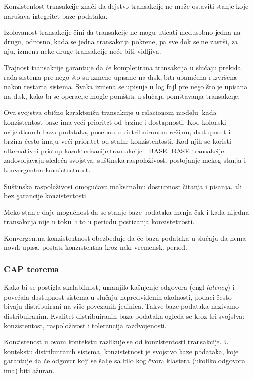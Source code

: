 \documentclass[12pt,oneside]{memoir}
\begin{document}
Konzistentost transakcije znači da dejstvo transakcije ne može ostaviti stanje koje narušava integritet baze podataka.

Izolovanost transakcije čini da transakcije ne mogu uticati međusobno jedna na drugu, odnosno, kada se jedna transakcija pokrene, pa sve dok se ne završi, za nju, izmena neke druge transakcije neće biti vidljiva.

Trajnost transakcije garantuje da će kompletirana transakcija u slučaju prekida rada sistema pre nego što su izmene upisane na disk, biti upamćena i izvršena nakon restarta sistema. Svaka izmena se upisuje u log fajl pre nego što je upisana na disk, kako bi se operacije mogle poništiti u slučaju poništavanja transakcije.

Ova svojstva obično karakterišu transakcije u relacionom modelu, kada konzistentost baze ima veći prioritet od brzine i dostupnosti. Kod kolonski orijentisanih baza podataka, posebno u distribuiranom režimu, dostupnost i brzina često imaju veći prioritet od stalne konzistentosti. Kod njih se koristi alternativni pristup karakterizacije transakcije - BASE. BASE transakcije zadovoljavaju sledeća svojstva: suštinska raspoloživost, postojanje mekog stanja i konvergentna konzistentnost.

Suštinska raspoloživost omogućava maksimalnu dostupnost čitanja i pisanja, ali bez garancije konzistentosti.

Meko stanje daje mogućnost da se stanje baze podataka menja čak i kada nijedna transakcija nije u toku, i to u periodu postizanja konzistetnosti.

Konvergentna konzistentnost obezbeđuje da će baza podataka u slučaju da nema novih upisa, postati konzistentna kroz neki vremenski period. 

\subsubsection{CAP teorema}

Kako bi se postigla skalabilnost, umanjilo kašnjenje odgovora (engl \textit{latency}) i povećala dostupnost sistema u slučaju nepredviđenih okolnosti, podaci često bivaju distribuirani na više povezanih jedinica. Takve baze podataka nazivamo distribuiranim. 
Kvalitet distribuiranih baza podataka ogleda se kroz tri svojstva: konzistentost, raspoloživost i tolerancija razdvojenosti.

Konzistenost u ovom kontekstu razlikuje se od konzistentosti transakcije. U kontekstu distribuiranih sistema, konzistetnost je svojstvo baze podataka, koje garantuje da će odgovor koji se šalje sa bilo kog čvora klastera (ukoliko odgovora ima) biti ažuran.
\end{document}
